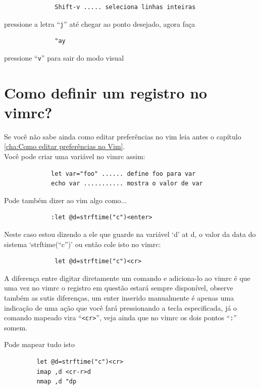 \documentclass[10pt,a4paper,openany]{book}
\begin{document}
\begin{verbatim}
			  Shift-v ..... seleciona linhas inteiras
\end{verbatim}

pressione a letra ``\verb|j|'' até chegar ao ponto desejado, agora faça

\begin{verbatim}
			  "ay
\end{verbatim}

pressione ``\verb|v|'' para sair do modo visual

\section{Como definir um registro no vimrc?}
\label{Como definir um registro no vimrc?}

Se você não sabe ainda como editar preferências no vim
leia antes o capítulo \ref{cha:Como editar preferências no Vim}. \\


Você pode criar uma variável no vimrc assim:

\begin{verbatim}
			 let var="foo" ...... define foo para var
			 echo var ........... mostra o valor de var
\end{verbatim}

Pode também dizer ao vim algo como...

\begin{verbatim}
			 :let @d=strftime("c")<enter>
\end{verbatim}

Neste caso estou dizendo a ele que guarde na variável `d' at d,
o valor da data do sistema `strftime(``c'')' ou então cole isto no
vimrc:

\begin{verbatim}
			  let @d=strftime("c")<cr>
\end{verbatim}

A diferença entre digitar diretamente um comando e adiciona-lo ao
vimrc é que uma vez no vimrc o registro em questão estará sempre
disponível, observe também as sutis diferenças, um enter inserido
manualmente é apenas uma indicação de uma ação que você fará
pressionando a tecla especificada, já o comando mapeado vira
``\verb|<cr>|'', veja ainda que no vimrc os dois pontos ``\verb|:|''
somem.

Pode mapear tudo isto

\begin{verbatim}
		 let @d=strftime("c")<cr>
		 imap ,d <cr-r>d
		 nmap ,d "dp
\end{verbatim}
\end{document}
